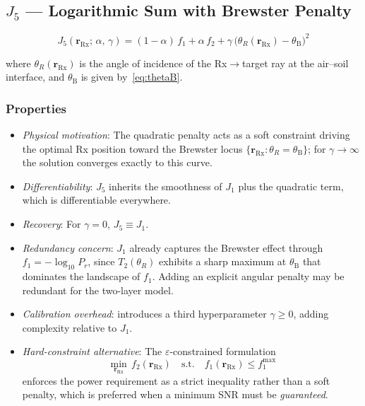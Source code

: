 \documentclass[journal]{IEEEtran}
\newcommand{\Rx}{\mathrm{Rx}}
\newcommand{\rRx}{\mathbf{r}_{\Rx}}
\newcommand{\thetaB}{\theta_{\mathrm{B}}}
\begin{document}
\subsection{\texorpdfstring{$J_5$}{J5} — Logarithmic Sum with Brewster Penalty}

\begin{equation}
  J_5(\rRx;\,\alpha,\,\gamma)
  = (1-\alpha)\,f_1 + \alpha\,f_2
    + \gamma\,\bigl(\theta_R(\rRx) - \thetaB\bigr)^2
  \label{eq:J5}
\end{equation}

where $\theta_R(\rRx)$ is the angle of incidence of the Rx$\to$target ray at
the air--soil interface, and $\thetaB$ is given by~\eqref{eq:thetaB}.

\subsubsection*{Properties}
\begin{itemize}
  \item \emph{Physical motivation}: The quadratic penalty acts as a soft
    constraint driving the optimal Rx position toward the Brewster locus
    $\{\rRx : \theta_R = \thetaB\}$; for $\gamma \to \infty$ the solution
    converges exactly to this curve.
  \item \emph{Differentiability}: $J_5$ inherits the smoothness of $J_1$ plus
    the quadratic term, which is differentiable everywhere.
  \item \emph{Recovery}: For $\gamma = 0$, $J_5 \equiv J_1$.
  \item \emph{Redundancy concern}: $J_1$ already captures the Brewster effect
    through $f_1 = -\log_{10} P_r$, since $T_2(\theta_R)$ exhibits a sharp
    maximum at $\thetaB$ that dominates the landscape of $f_1$. Adding an
    explicit angular penalty may be redundant for the two-layer model.
  \item \emph{Calibration overhead}: introduces a third hyperparameter
    $\gamma \geq 0$, adding complexity relative to $J_1$.
  \item \emph{Hard-constraint alternative}: The $\varepsilon$-constrained
    formulation
    \begin{equation}
      \min_{\rRx}\,f_2(\rRx)\quad
      \text{s.t.}\quad f_1(\rRx) \leq f_1^{\max}
      \label{eq:eps_constrained}
    \end{equation}
    enforces the power requirement as a strict inequality rather than a soft
    penalty, which is preferred when a minimum SNR must be \emph{guaranteed}.
\end{itemize}
\end{document}
